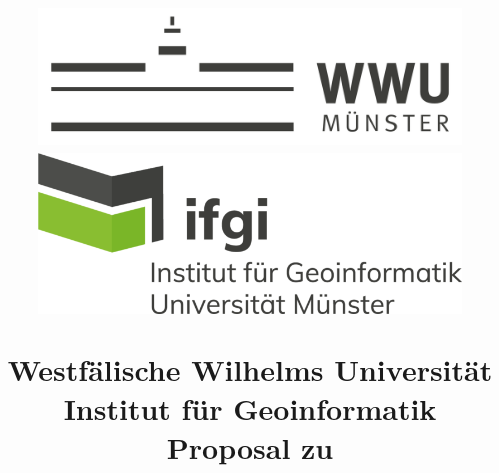 \documentclass[a4paper,11pt,pdftex, parskip]{scrreprt}
\begin{document}
\begin{titlepage}

  
    \title{
        \begin{figure}[t]
            \centering
            \includegraphics[scale = 0.125, keepaspectratio]{Logos/wwu_logo.png}
            \hspace{1cm}
            \includegraphics[scale = 0.9, keepaspectratio]{Logos/ifgi_logo.png}
        \end{figure}
          
           
        \textnormal{ 
            \normalsize \Large 
            Westfälische Wilhelms Universität \\ Institut für Geoinformatik\\
            \vspace{3cm}
            Proposal zu\\}
        \grqq
        \vspace{1,5cm}}


\end{titlepage}
\end{document}
